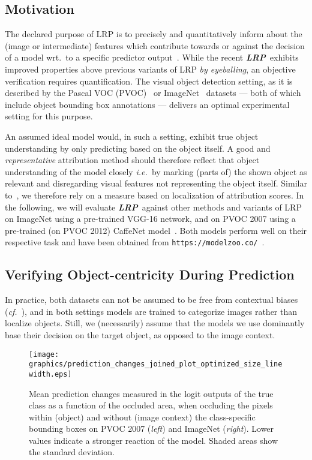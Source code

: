 \documentclass[conference]{IEEEtran}
\def\ie{\emph{i.e.~}}
\def\cf{\emph{cf.~}}
\def\wrt{wrt.~}
\newcommand{\lrpcnn}[0]{\emph{LRP}}
\newcommand{\LRPCMP}[0]{\textbf{\lrpcnn}}
\begin{document}
\subsection{Motivation}
The declared purpose of LRP is to precisely and quantitatively inform about the (image or intermediate) features which contribute towards or against the decision of a model \wrt to a specific predictor output~\cite{bach2015pixel}.
While the recent \LRPCMP~exhibits improved properties above previous variants of LRP \emph{by eyeballing},
an objective verification requires quantification.
The visual object detection setting, as it is described by the Pascal VOC (PVOC)~\cite{pascal-voc-2012} or ImageNet~\cite{krizhevsky2012imagenet} datasets --- both of which include object bounding box annotations --- delivers an optimal experimental setting for this purpose.

An assumed ideal model would, in such a setting, exhibit true object understanding by only predicting based on the object itself.
A good and \emph{representative} attribution method should therefore reflect that object understanding of the model closely
\ie by marking (parts of) the shown object as relevant and disregarding visual features not representing the object itself.
Similar to~\cite{lapuschkin2016analyzing}, we therefore rely on a measure based on localization of attribution scores.
In the following, we will evaluate \LRPCMP~against other methods and variants of LRP
on ImageNet using a pre-trained VGG-16 network,
and on PVOC 2007 using a pre-trained (on PVOC 2012) CaffeNet model~\cite{lapuschkin2016analyzing}.
Both models perform well on their respective task
and have been obtained from \texttt{https://modelzoo.co/}~.

\subsection{Verifying Object-centricity During Prediction}
In practice, both datasets can not be assumed to be free from contextual biases (\cf\cite{lapuschkin2019unmasking,anders2019analyzing}),
and in both settings models are trained to categorize images rather than localize objects.
Still, we (necessarily) assume that the models we use dominantly base their decision on the target object,
as opposed to the image context.

\begin{figure}[!t]
  \begin{center}
  \texttt{[image: graphics/prediction\_changes\_joined\_plot\_optimized\_size\_linewidth.eps]}
  \end{center}
	\caption{Mean prediction changes  measured in the logit outputs of the true class as a function of the occluded area,
	    when occluding the pixels within (object) and without (image context) the class-specific bounding boxes
            on PVOC 2007 (\emph{left}) and ImageNet (\emph{right}). Lower values indicate a stronger reaction of the model.
            Shaded areas show the standard deviation.
          }
  \label{fig:bbx_occlusion}
\end{figure}
\end{document}
